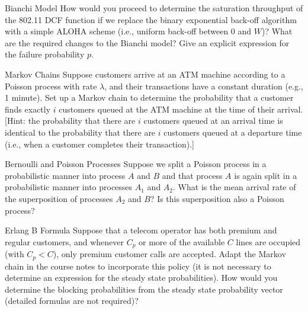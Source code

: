 \begin{problem}{Bianchi Model}
How would you proceed to determine the saturation throughput of
the 802.11 DCF function if we replace the binary exponential back-off algorithm with
a simple ALOHA scheme (i.e., uniform back-off between $0$ and $W$)? What are
the required changes to the Bianchi model? Give an explicit expression for the failure
probability $p$.
\end{problem}

\begin{problem}{Markov Chains}
Suppose customers arrive at an ATM machine according to a Poisson
process with rate $\lambda$, and their transactions have a constant duration (e.g., 1 minute).
Set up a Markov chain to determine the probability that a customer finds exactly $i$
customers queued at the ATM machine at the time of their arrival. [Hint: the probability
that there are $i$ customers queued at an arrival time is identical to the probability that
there are $i$ customers queued at a departure time (i.e., when a customer completes their
transaction).]
\end{problem}

\begin{problem}{Bernoulli and Poisson Processes}
Suppose we split a Poisson process in a probabilistic manner into process $A$ and $B$ and that process $A$ is again split in a probabilistic
manner into processes $A_1$ and $A_2$. What is the mean arrival rate of the superposition of
processes $A_2$ and $B$? Is this superposition also a Poisson process?
\end{problem}

\begin{problem}{Erlang B Formula}
Suppose that a telecom operator has both premium and regular
customers, and whenever $C_p$ or more of the available $C$ lines are occupied (with $C_p < C$),
only premium customer calls are accepted. Adapt the Markov chain in the course notes
to incorporate this policy (it is not necessary to determine an expression for the steady
state probabilities). How would you determine the blocking probabilities from the steady
state probability vector (detailed formulas are not required)?
\end{problem}
